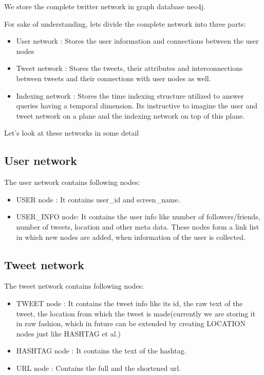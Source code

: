 \documentclass[letterpaper,10pt,english]{sphinxmanual}
\begin{document}
We store the complete twitter network in graph database neo4j.

For sake of understanding, lets divide the complete network into three parts:
\begin{itemize}
\item {} 
User network : Stores the user information and connections between the user nodes

\item {} 
Tweet network : Stores the tweets, their attributes and interconnections between tweets and their connections with user nodes as well.

\item {} 
Indexing network : Stores the time indexing structure utilized to answer queries having a temporal dimension. Its instructive to imagine the user and tweet network on a plane and the indexing network on top of this plane.

\end{itemize}

Let’s look at these networks in some detail


\subsection{User network}
\label{\detokenize{neo4j_data_ingestion:user-network}}
The user network contains following nodes:
\begin{itemize}
\item {} 
USER node : It contains user\_id and screen\_name.

\item {} 
USER\_INFO node: It contains the user info like number of followers/friends, number of tweets, location and other meta data. These nodes form a link list in which new nodes are added, when information of the user is collected.

\end{itemize}

\noindent{}

\noindent{}


\subsection{Tweet network}
\label{\detokenize{neo4j_data_ingestion:tweet-network}}
The tweet network contains following nodes:
\begin{itemize}
\item {} 
TWEET node : It contains the tweet info like its id, the raw text of the tweet, the location from which the tweet is made(currently we are storing it in raw fashion, which in future can be extended by creating LOCATION nodes just like HASHTAG et al.)

\item {} 
HASHTAG node : It contains the text of the hashtag.

\item {} 
URL node : Contains the full and the shortened url.

\end{itemize}
\end{document}
